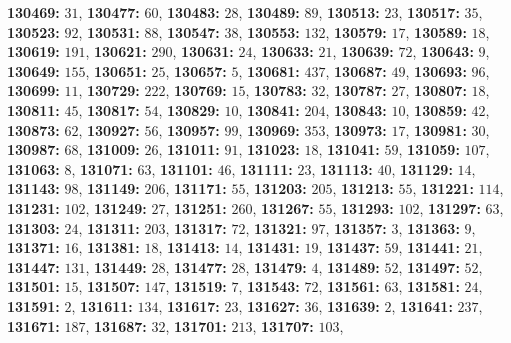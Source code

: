 \textsf{\bfseries 130469:} $31$, \textsf{\bfseries 130477:} $60$, \textsf{\bfseries 130483:} $28$, \textsf{\bfseries 130489:} $89$, \textsf{\bfseries 130513:} $23$, \textsf{\bfseries 130517:} $35$, \textsf{\bfseries 130523:} $92$, \textsf{\bfseries 130531:} $88$, \textsf{\bfseries 130547:} $38$, \textsf{\bfseries 130553:} $132$, \textsf{\bfseries 130579:} $17$, \textsf{\bfseries 130589:} $18$, \textsf{\bfseries 130619:} $191$, \textsf{\bfseries 130621:} $290$, \textsf{\bfseries 130631:} $24$, \textsf{\bfseries 130633:} $21$, \textsf{\bfseries 130639:} $72$, \textsf{\bfseries 130643:} $9$, \textsf{\bfseries 130649:} $155$, \textsf{\bfseries 130651:} $25$, \textsf{\bfseries 130657:} $5$, \textsf{\bfseries 130681:} $437$, \textsf{\bfseries 130687:} $49$, \textsf{\bfseries 130693:} $96$, \textsf{\bfseries 130699:} $11$, \textsf{\bfseries 130729:} $222$, \textsf{\bfseries 130769:} $15$, \textsf{\bfseries 130783:} $32$, \textsf{\bfseries 130787:} $27$, \textsf{\bfseries 130807:} $18$, \textsf{\bfseries 130811:} $45$, \textsf{\bfseries 130817:} $54$, \textsf{\bfseries 130829:} $10$, \textsf{\bfseries 130841:} $204$, \textsf{\bfseries 130843:} $10$, \textsf{\bfseries 130859:} $42$, \textsf{\bfseries 130873:} $62$, \textsf{\bfseries 130927:} $56$, \textsf{\bfseries 130957:} $99$, \textsf{\bfseries 130969:} $353$, \textsf{\bfseries 130973:} $17$, \textsf{\bfseries 130981:} $30$, \textsf{\bfseries 130987:} $68$, \textsf{\bfseries 131009:} $26$, \textsf{\bfseries 131011:} $91$, \textsf{\bfseries 131023:} $18$, \textsf{\bfseries 131041:} $59$, \textsf{\bfseries 131059:} $107$, \textsf{\bfseries 131063:} $8$, \textsf{\bfseries 131071:} $63$, \textsf{\bfseries 131101:} $46$, \textsf{\bfseries 131111:} $23$, \textsf{\bfseries 131113:} $40$, \textsf{\bfseries 131129:} $14$, \textsf{\bfseries 131143:} $98$, \textsf{\bfseries 131149:} $206$, \textsf{\bfseries 131171:} $55$, \textsf{\bfseries 131203:} $205$, \textsf{\bfseries 131213:} $55$, \textsf{\bfseries 131221:} $114$, \textsf{\bfseries 131231:} $102$, \textsf{\bfseries 131249:} $27$, \textsf{\bfseries 131251:} $260$, \textsf{\bfseries 131267:} $55$, \textsf{\bfseries 131293:} $102$, \textsf{\bfseries 131297:} $63$, \textsf{\bfseries 131303:} $24$, \textsf{\bfseries 131311:} $203$, \textsf{\bfseries 131317:} $72$, \textsf{\bfseries 131321:} $97$, \textsf{\bfseries 131357:} $3$, \textsf{\bfseries 131363:} $9$, \textsf{\bfseries 131371:} $16$, \textsf{\bfseries 131381:} $18$, \textsf{\bfseries 131413:} $14$, \textsf{\bfseries 131431:} $19$, \textsf{\bfseries 131437:} $59$, \textsf{\bfseries 131441:} $21$, \textsf{\bfseries 131447:} $131$, \textsf{\bfseries 131449:} $28$, \textsf{\bfseries 131477:} $28$, \textsf{\bfseries 131479:} $4$, \textsf{\bfseries 131489:} $52$, \textsf{\bfseries 131497:} $52$, \textsf{\bfseries 131501:} $15$, \textsf{\bfseries 131507:} $147$, \textsf{\bfseries 131519:} $7$, \textsf{\bfseries 131543:} $72$, \textsf{\bfseries 131561:} $63$, \textsf{\bfseries 131581:} $24$, \textsf{\bfseries 131591:} $2$, \textsf{\bfseries 131611:} $134$, \textsf{\bfseries 131617:} $23$, \textsf{\bfseries 131627:} $36$, \textsf{\bfseries 131639:} $2$, \textsf{\bfseries 131641:} $237$, \textsf{\bfseries 131671:} $187$, \textsf{\bfseries 131687:} $32$, \textsf{\bfseries 131701:} $213$, \textsf{\bfseries 131707:} $103$, 
